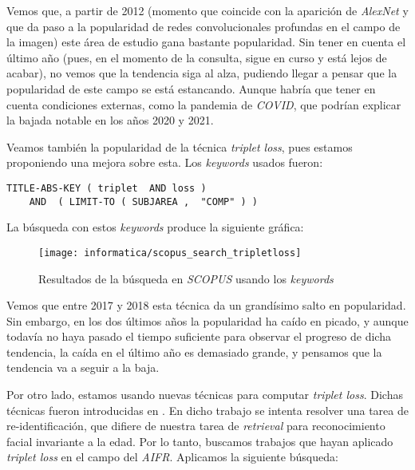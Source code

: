 Vemos que, a partir de 2012 (momento que coincide con la aparición de \textit{AlexNet} y que da paso a la popularidad de redes convolucionales profundas en el campo de la imagen) este área de estudio gana bastante popularidad. Sin tener en cuenta el último año (pues, en el momento de la consulta, sigue en curso y está lejos de acabar), no vemos que la tendencia siga al alza, pudiendo llegar a pensar que la popularidad de este campo se está estancando. Aunque habría que tener en cuenta condiciones externas, como la pandemia de \textit{COVID}, que podrían explicar la bajada notable en los años 2020 y 2021.

Veamos también la popularidad de la técnica \textit{triplet loss}, pues estamos proponiendo una mejora sobre esta. Los \textit{keywords} usados fueron:

\begin{lstlisting}[caption=\textit{Keywords usados para la búsqueda en \textit{SCOPUS} para consultar la popularidad del \textit{triplet loss}. Búsqueda realizada el 17 de Septiembre de 2023}, label=code:scopus_search_tripletloss, captionpos=b]
    TITLE-ABS-KEY ( triplet  AND loss )
    AND  ( LIMIT-TO ( SUBJAREA ,  "COMP" ) )
\end{lstlisting}

La búsqueda con estos \textit{keywords} produce la siguiente gráfica:

\begin{figure}[H]
    \centering
    \texttt{[image: informatica/scopus\_search\_tripletloss]}
    \caption{Resultados de la búsqueda en \textit{SCOPUS} usando los \textit{keywords} }
\end{figure}

Vemos que entre 2017 y 2018 esta técnica da un grandísimo salto en popularidad. Sin embargo, en los dos últimos años la popularidad ha caído en picado, y aunque todavía no haya pasado el tiempo suficiente para observar el progreso de dicha tendencia, la caída en el último año es demasiado grande, y pensamos que la tendencia va a seguir a la baja.

Por otro lado, estamos usando nuevas técnicas para computar \textit{triplet loss}. Dichas técnicas fueron introducidas en \cite{informatica:principal}. En dicho trabajo se intenta resolver una tarea de re-identificación, que difiere de nuestra tarea de \textit{retrieval} para reconocimiento facial invariante a la edad. Por lo tanto, buscamos trabajos que hayan aplicado \textit{triplet loss} en el campo del \textit{AIFR}. Aplicamos la siguiente búsqueda:

